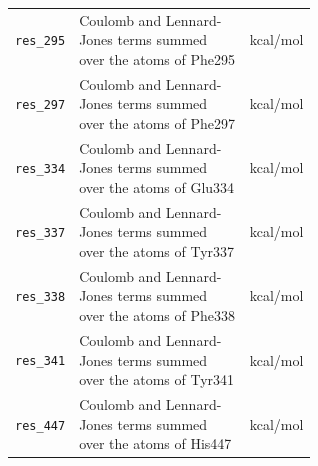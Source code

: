 \begin{tabular}{l>{\raggedright\arraybackslash}p{0.60\linewidth}l}
\texttt{res\_295} & Coulomb and Lennard-Jones terms summed over the atoms of Phe295 & kcal/mol \\
\texttt{res\_297} & Coulomb and Lennard-Jones terms summed over the atoms of Phe297 & kcal/mol \\
\texttt{res\_334} & Coulomb and Lennard-Jones terms summed over the atoms of Glu334 & kcal/mol \\
\texttt{res\_337} & Coulomb and Lennard-Jones terms summed over the atoms of Tyr337 & kcal/mol \\
\texttt{res\_338} & Coulomb and Lennard-Jones terms summed over the atoms of Phe338 & kcal/mol \\
\texttt{res\_341} & Coulomb and Lennard-Jones terms summed over the atoms of Tyr341 & kcal/mol \\
\texttt{res\_447} & Coulomb and Lennard-Jones terms summed over the atoms of His447 & kcal/mol \\
\bottomrule
\end{tabular}
